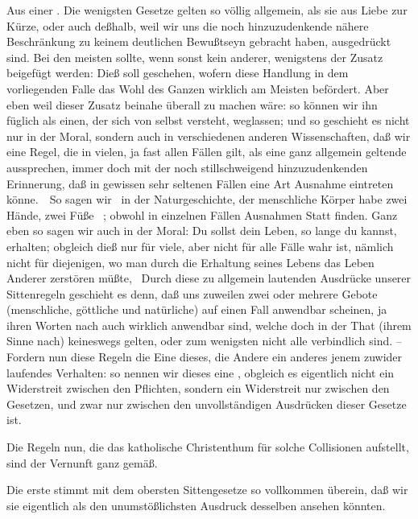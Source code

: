 \begin{aufza}
\begin{aufzb}
\item Aus einer . Die wenigsten Gesetze gelten so völlig allgemein, als sie aus Liebe zur Kürze, oder auch deßhalb, weil wir uns die noch hinzuzudenkende nähere Beschränkung zu keinem deutlichen Bewußtseyn gebracht haben, ausgedrückt sind. Bei den meisten sollte, wenn sonst kein anderer, wenigstens der Zusatz beigefügt werden: Dieß soll geschehen, wofern diese Handlung in dem vorliegenden Falle das Wohl des Ganzen wirklich am Meisten befördert. Aber eben weil dieser Zusatz beinahe überall zu machen wäre: so können wir ihn füglich als einen, der sich von selbst versteht, weglassen; und so geschieht es nicht nur in der Moral, sondern auch in verschiedenen anderen Wissenschaften, daß wir eine Regel, die in vielen, ja fast allen Fällen gilt, als eine ganz allgemein geltende aussprechen, immer doch mit der noch stillschweigend hinzuzudenkenden Erinnerung, daß in gewissen sehr seltenen Fällen eine Art Ausnahme eintreten könne.~\ So sagen wir \zB\  in der Naturgeschichte, der menschliche Körper habe zwei Hände, zwei Füße \udgl\ ; obwohl in einzelnen Fällen Ausnahmen Statt finden. Ganz eben so sagen wir auch in der Moral: Du sollst dein Leben, so lange du kannst, erhalten; obgleich dieß nur für viele, aber nicht für alle Fälle wahr ist, nämlich nicht für diejenigen, wo man durch die Erhaltung seines Lebens das Leben Anderer zerstören müßte, \udgl\  Durch diese zu allgemein lautenden Ausdrücke unserer Sittenregeln geschieht es denn, daß uns zuweilen zwei oder mehrere Gebote (menschliche, göttliche und natürliche) auf einen Fall anwendbar scheinen, ja ihren Worten nach auch wirklich anwendbar sind, welche doch in der That (ihrem Sinne nach) keineswegs gelten, oder zum wenigsten nicht alle verbindlich sind. -- Fordern nun diese Regeln die Eine dieses, die Andere ein anderes jenem zuwider laufendes Verhalten: so nennen wir dieses eine , obgleich es eigentlich nicht ein Widerstreit zwischen den Pflichten, sondern ein Widerstreit nur zwischen den Gesetzen, und zwar nur zwischen den unvollständigen Ausdrücken dieser Gesetze ist.
\end{aufzb}
Die Regeln nun, die das katholische Christenthum für solche Collisionen aufstellt, sind der Vernunft ganz gemäß.
\begin{aufzb}
\item Die erste stimmt mit dem obersten Sittengesetze so vollkommen überein, daß wir sie eigentlich als den unumstößlichsten Ausdruck desselben ansehen könnten.

\end{aufzb}
\end{aufza}
